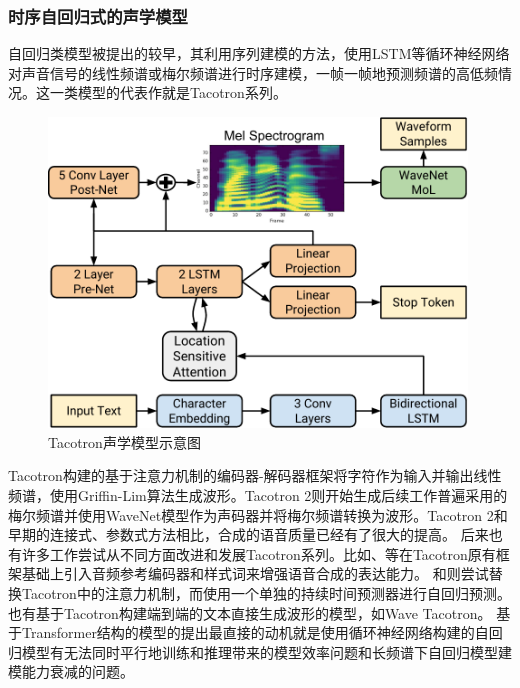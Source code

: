 \subsubsection{时序自回归式的声学模型}
自回归类模型被提出的较早，其利用序列建模的方法，使用LSTM等循环神经网络对声音信号的线性频谱或梅尔频谱进行时序建模，一帧一帧地预测频谱的高低频情况。这一类模型的代表作就是Tacotron系列。
\begin{figure}[htbp]
  \includegraphics[width=0.99\textwidth]{figure/related/tacotron2.pdf}
  \caption{Tacotron声学模型示意图}
\end{figure}
Tacotron\citep{tacotron}构建的基于注意力机制的编码器-解码器框架将字符作为输入并输出线性频谱，使用Griffin-Lim算法\citep{GriffinLim}生成波形。Tacotron 2\citep{shen2018natural}则开始生成后续工作普遍采用的梅尔频谱并使用WaveNet\citep{vanwavenet}模型作为声码器并将梅尔频谱转换为波形。Tacotron 2和早期的连接式、参数式方法相比，合成的语音质量已经有了很大的提高。
后来也有许多工作尝试从不同方面改进和发展Tacotron系列。比如\citet{gsttacotron}、\citet{reftacotron}等在Tacotron原有框架基础上引入音频参考编码器和样式词来增强语音合成的表达能力。
\citet{nonattentivetacotron}和\citet{durian}则尝试替换Tacotron中的注意力机制，而使用一个单独的持续时间预测器进行自回归预测。
也有基于Tacotron构建端到端的文本直接生成波形的模型，如Wave Tacotron\citep{wavetacotron}。
基于Transformer结构的模型的提出最直接的动机就是使用循环神经网络构建的自回归模型有无法同时平行地训练和推理带来的模型效率问题和长频谱下自回归模型建模能力衰减的问题。

